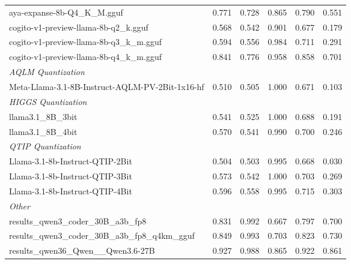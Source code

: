 \begin{table}[htbp]
{\begin{tabular}{lrrrrr}
    aya-expanse-8b-Q4\_K\_M.gguf & 0.771 & 0.728 & 0.865 & 0.790 & 0.551 \\
    cogito-v1-preview-llama-8b-q2\_k.gguf & 0.568 & 0.542 & 0.901 & 0.677 & 0.179 \\
    cogito-v1-preview-llama-8b-q3\_k\_m.gguf & 0.594 & 0.556 & 0.984 & 0.711 & 0.291 \\
    cogito-v1-preview-llama-8b-q4\_k\_m.gguf & 0.841 & 0.776 & 0.958 & 0.858 & 0.701 \\
    \midrule
    \multicolumn{6}{l}{\textit{AQLM Quantization}} \\
    \midrule
    Meta-Llama-3.1-8B-Instruct-AQLM-PV-2Bit-1x16-hf & 0.510 & 0.505 & 1.000 & 0.671 & 0.103 \\
    \midrule
    \multicolumn{6}{l}{\textit{HIGGS Quantization}} \\
    \midrule
    llama3.1\_8B\_3bit & 0.541 & 0.525 & 1.000 & 0.688 & 0.191 \\
    llama3.1\_8B\_4bit & 0.570 & 0.541 & 0.990 & 0.700 & 0.246 \\
    \midrule
    \multicolumn{6}{l}{\textit{QTIP Quantization}} \\
    \midrule
    Llama-3.1-8b-Instruct-QTIP-2Bit & 0.504 & 0.503 & 0.995 & 0.668 & 0.030 \\
    Llama-3.1-8b-Instruct-QTIP-3Bit & 0.573 & 0.542 & 1.000 & 0.703 & 0.269 \\
    Llama-3.1-8b-Instruct-QTIP-4Bit & 0.596 & 0.558 & 0.995 & 0.715 & 0.303 \\
    \midrule
    \multicolumn{6}{l}{\textit{Other}} \\
    \midrule
    results\_qwen3\_coder\_30B\_a3b\_fp8 & 0.831 & 0.992 & 0.667 & 0.797 & 0.700 \\
    results\_qwen3\_coder\_30B\_a3b\_fp8\_q4km\_gguf & 0.849 & 0.993 & 0.703 & 0.823 & 0.730 \\
    results\_qwen36\_Qwen\_\_Qwen3.6-27B & 0.927 & 0.988 & 0.865 & 0.922 & 0.861 \\
    \bottomrule
  \end{tabular}
  }
\end{table}

